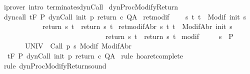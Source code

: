 \begin{isabellebody}
\ {\isacharparenleft}iprover\ intro{\isacharcolon}\ terminates{\isacharunderscore}dynCall{\isacharparenright}\isanewline
{}\isamarkupfalse%
%
\endisatagproof
{\isafoldproof}%
%
\isadelimproof
\isanewline
%
\endisadelimproof
\isanewline
{}\isamarkupfalse%
\ dynProcModifyReturn{\isacharcolon}\isanewline
{}\ dyn{\isacharunderscore}call{\isacharcolon}\ {\isachardoublequoteopen}{\isasymGamma}{\isacharcomma}{\isasymTheta}{\isasymturnstile}\isactrlsub t\isactrlbsub {\isacharslash}F\isactrlesub \ P\ dynCall\ init\ p\ return{\isacharprime}\ c\ Q{\isacharcomma}A{\isachardoublequoteclose}\isanewline
{}\ ret{\isacharunderscore}modif{\isacharcolon}\isanewline
\ \ \ \ {\isachardoublequoteopen}{\isasymforall}s\ t{\isachardot}\ t\ {\isasymin}\ Modif\ {\isacharparenleft}init\ s{\isacharparenright}\ \isanewline
\ \ \ \ \ \ \ \ \ \ \ {\isasymlongrightarrow}\ return{\isacharprime}\ s\ t\ {\isacharequal}\ return\ s\ t{\isachardoublequoteclose}\isanewline
{}\ ret{\isacharunderscore}modifAbr{\isacharcolon}\ {\isachardoublequoteopen}{\isasymforall}s\ t{\isachardot}\ t\ {\isasymin}\ ModifAbr\ {\isacharparenleft}init\ s{\isacharparenright}\ \isanewline
\ \ \ \ \ \ \ \ \ \ \ \ \ \ \ \ \ \ \ \ \ \ \ \ \ \ \ \ \ {\isasymlongrightarrow}\ return{\isacharprime}\ s\ t\ {\isacharequal}\ return\ s\ t{\isachardoublequoteclose}\isanewline
{}\ modif{\isacharcolon}\ \isanewline
\ \ \ \ {\isachardoublequoteopen}{\isasymforall}s\ {\isasymin}\ P{\isachardot}\ {\isasymforall}{\isasymsigma}{\isachardot}\ \ \isanewline
\ \ \ \ \ \ \ {\isasymGamma}{\isacharcomma}{\isasymTheta}{\isasymturnstile}\isactrlbsub {\isacharslash}UNIV\isactrlesub \ {\isacharbraceleft}{\isasymsigma}{\isacharbraceright}\ Call\ {\isacharparenleft}p\ s{\isacharparenright}\ {\isacharparenleft}Modif\ {\isasymsigma}{\isacharparenright}{\isacharcomma}{\isacharparenleft}ModifAbr\ {\isasymsigma}{\isacharparenright}{\isachardoublequoteclose}\ \isanewline
{}\ {\isachardoublequoteopen}{\isasymGamma}{\isacharcomma}{\isasymTheta}\ {\isasymturnstile}\isactrlsub t\isactrlbsub {\isacharslash}F\isactrlesub \ P\ {\isacharparenleft}dynCall\ init\ p\ return\ c{\isacharparenright}\ Q{\isacharcomma}A{\isachardoublequoteclose}\isanewline
%
\isadelimproof
%
\endisadelimproof
%
\isatagproof
{}\isamarkupfalse%
\ {\isacharparenleft}rule\ hoaret{\isacharunderscore}complete{\isacharprime}{\isacharparenright}\isanewline
{}\isamarkupfalse%
\ {\isacharparenleft}rule\ dynProcModifyReturn{\isacharunderscore}sound\ \isanewline

\end{isabellebody}
